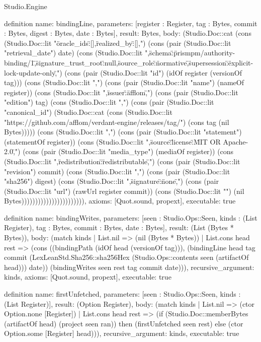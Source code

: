 \begin{lexlean}{Studio.Engine}
\begin{semanticmodule}
definition{
  name: bindingLine,
  parameters: [register : Register, tag : Bytes, commit : Bytes, digest : Bytes, date : Bytes],
  result: Bytes,
  body: (Studio.Doc::cat (cons (Studio.Doc::lit "{\"oracle_ids\":[],\"realized_by\":[],") (cons (pair (Studio.Doc::lit "retrieval_date") date) (cons (Studio.Doc::lit ",\"schema\":\"prismpm/authority-binding/1\",\"signature_trust_root\":null,\"source_role\":\"normative\",\"supersession\":\"explicit-lock-update-only\",") (cons (pair (Studio.Doc::lit "id") (idOf register (versionOf tag))) (cons (Studio.Doc::lit ",") (cons (pair (Studio.Doc::lit "name") (nameOf register)) (cons (Studio.Doc::lit ",\"issuer\":\"afflom\",") (cons (pair (Studio.Doc::lit "edition") tag) (cons (Studio.Doc::lit ",") (cons (pair (Studio.Doc::lit "canonical_id") (Studio.Doc::cat (cons (Studio.Doc::lit "https://github.com/afflom/verdant-engine/releases/tag/") (cons tag (nil Bytes))))) (cons (Studio.Doc::lit ",") (cons (pair (Studio.Doc::lit "statement") (statementOf register)) (cons (Studio.Doc::lit ",\"source\":{\"license\":\"MIT OR Apache-2.0\",") (cons (pair (Studio.Doc::lit "media_type") (mediaOf register)) (cons (Studio.Doc::lit ",\"redistribution\":\"redistributable\",") (cons (pair (Studio.Doc::lit "revision") commit) (cons (Studio.Doc::lit ",") (cons (pair (Studio.Doc::lit "sha256") digest) (cons (Studio.Doc::lit ",\"signature\":\"none\",") (cons (pair (Studio.Doc::lit "url") (rawUrl register commit)) (cons (Studio.Doc::lit "}}\n") (nil Bytes))))))))))))))))))))))),
  axioms: [Quot.sound, propext],
  executable: true
}

definition{
  name: bindingWrites,
  parameters: [seen : Studio.Ops::Seen, kinds : (List Register), tag : Bytes, commit : Bytes, date : Bytes],
  result: (List (Bytes * Bytes)),
  body: (match kinds
    | List.nil => (nil (Bytes * Bytes))
    | List.cons head rest => (cons ((bindingPath (idOf head (versionOf tag))), (bindingLine head tag commit (LexLeanStd.Sha256::sha256Hex (Studio.Ops::contents seen (artifactOf head))) date)) (bindingWrites seen rest tag commit date))),
  recursive_argument: kinds,
  axioms: [Quot.sound, propext],
  executable: true
}

definition{
  name: firstUnfetched,
  parameters: [seen : Studio.Ops::Seen, kinds : (List Register)],
  result: (Option Register),
  body: (match kinds
    | List.nil => (ctor Option.none [Register])
    | List.cons head rest => (if (Studio.Doc::memberBytes (artifactOf head) (project seen ran)) then (firstUnfetched seen rest) else (ctor Option.some [Register] head))),
  recursive_argument: kinds,
  executable: true
}


\end{semanticmodule}
\end{lexlean}

